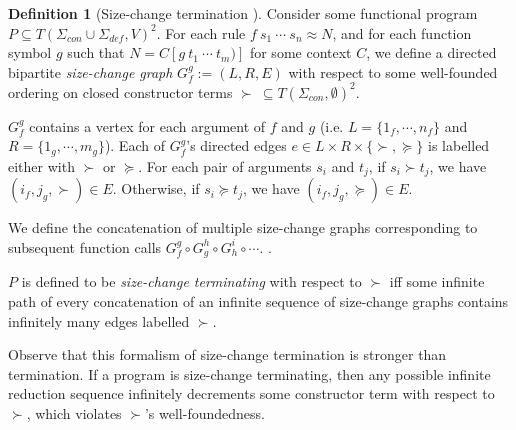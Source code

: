 \documentclass{article}
\theoremstyle{definition}
\newtheorem{definition}[theorem]{Definition}
\begin{document}
\begin{definition}[Size-change termination \cite{lee2001sizechange,thiemann2005sizechange}]
    Consider some functional program $P \subseteq T(\Sigma_{con} \cup \Sigma_{def}, V)^2$. For each rule $f ~ s_1 ~ \cdots ~ s_n \approx N$, and for each function symbol $g$ such that $N = C[g ~ t_1 ~ \cdots ~ t_m)]$ for some context $C$, we define a directed bipartite \emph{size-change graph} $G_f^g := (L, R, E)$ with respect to some well-founded ordering on closed constructor terms $\succ ~ \subseteq T(\Sigma_{con}, \emptyset)^2$.

    $G_f^g$ contains a vertex for each argument of $f$ and $g$ (i.e. $L = \{1_f, \cdots, n_f\}$ and $R = \{1_g, \cdots, m_g\}$). Each of $G_f^g$'s directed edges $e \in L \times R \times \{\succ, \succeq\}$ is labelled either with $\succ$ or $\succeq$. For each pair of arguments $s_i$ and $t_j$, if $s_i \succ t_j$, we have $(i_f, j_g, \succ) \in E$. Otherwise, if $s_i \succeq t_j$, we have $(i_f, j_g, \succeq) \in E$.

    We define the concatenation of multiple size-change graphs corresponding to subsequent function calls $G_f^g \circ G_g^h \circ G_h^i \circ \cdots$. .

   $P$ is defined to be \emph{size-change terminating} with respect to $\succ$ iff some infinite path of every concatenation of an infinite sequence of size-change graphs contains infinitely many edges labelled $\succ$.
\end{definition}
Observe that this formalism of size-change termination is stronger than termination. If a program is size-change terminating, then any possible infinite reduction sequence infinitely decrements some constructor term with respect to $\succ$, which violates $\succ$'s well-foundedness.
\end{document}
